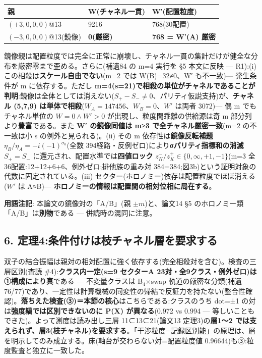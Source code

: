 \documentclass[
]{ltjsarticle}
\newcounter{none} %
\begin{document}
{\def\LTcaptype{none} %
\begin{longtable}[]{@{}lll@{}}
\toprule\noalign{}
親 & W(チャネル一貫) & W′(配置粒度) \\
\midrule\noalign{}
\endhead
\bottomrule\noalign{}
\endlastfoot
\((+3,0,0,0)\)@13 & 9216 & 768(30配置) \\
\((-3,0,0,0)\)@13(鏡像) & \textbf{0(厳密)} & \textbf{768 = W′(A)
厳密} \\
\end{longtable}
}

鏡像親は配置粒度では完全に正常に崩壊し、チャネル一貫の集計だけが健全な分布を厳密零まで歪める。さらに(補遺84
の m=4 実行を §5 本文に反映 --- R1):(i)
この相殺は\textbf{スケール自由でない}(m=2 では W(B)=32≠0、W′
も不一致)--- 発生条件が m に依存する。ただし
\textbf{m=4(s=21)で相殺の単位がチャネルであることが判明}:鏡像は全体としては消えない(\(S_+-S_-\neq0\)、パリティ仮説支持)が、\textbf{チャネル
(5,7,9) は単体で相殺}(\(W_A=147456\)、\(W_B=0\)、\(W'\) は両者 3072)---
偶 m でもチャネル単位の \(W=0\wedge W'>0\)
が出現し、粒度間乖離の供給源は奇 m 部分列より\textbf{豊富}である。また
\textbf{W′ の鏡像同値は m≥3 で全チャネル厳密一致}(m=2 の不一致は小 s
の例外と見られる)。(ii) その m 依存性は\textbf{鏡像反転補題}
\(\eta_B/\eta_A=-i(-1)^{\sigma_0}\)(全数
394経路・反例ゼロ)により\textbf{σパリティ指標和の消滅} \(S_+=S_-\)
に還元され、配置水準では\textbf{四値ロック}
\(z^-_K/z^+_K\in\{0,\infty,+1,-1\}\)(m=3
全36配置:12+12+6+6、例外ゼロ;排他族の重み対
384=384;図3b)という証明対象の代数に固定されている。(iii)
セクター(ホロノミー)依存は配置粒度でほぼ消える(\(W'\) は A≈B)---
\textbf{ホロノミーの情報は配置間の相対位相に局在する}。

\textbf{用語注記}: 本論文の鏡像対の「A/B」(親 \(\pm m\))と、論文14 §5
のホロノミー類「A/B」は\textbf{別物}である --- 併読時の混同に注意。

\subsection{6.
定理4:条件付けは枝チャネル層を要求する}\label{ux5b9aux74064ux6761ux4ef6ux4ed8ux3051ux306fux679dux30c1ux30e3ux30cdux30ebux5c64ux3092ux8981ux6c42ux3059ux308b}

双子の結合振幅は親対の相対配置に強く依存する(完全相殺対を含む)。検査の三層区別(査読
\#4):\textbf{クラス内一定(s=9 セクターA
23対・全9クラス・例外ゼロ)は①構成により真}である --- 不変量クラスは
B\(_{4}\)×swap
軌道の厳密な分類(補遺76/77)であり、一定性は計算機械の同変性の帰結で反証力を持たない(整合性確認)。\textbf{落ちえた検査(③)＝本節の核心}はこちらである:クラスのうち
dot=±1 の対は\textbf{強度縞では区別できないのに P(X) が異なる}(0.972 vs
0.994 --- 等しいこともできた)。よって測度は読み出し三層 11⊂13⊂21(論文13
定理3)の\textbf{層1〜2
では支えられず、層3(枝チャネル)を要求する}。「干渉粒度=記録区別能」の原理は、層を明示してのみ成立する。床(軸台が交わらない対=配置粒度値
0.96644)も③:粒度監査と独立に一致した。
\end{document}

